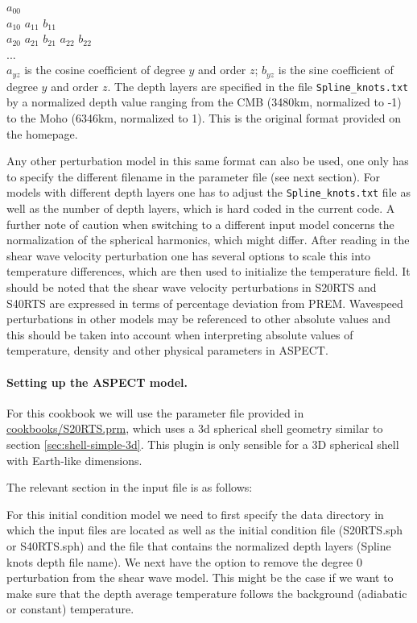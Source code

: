 \documentclass{article}
\newcommand{\aspect}{\textsc{ASPECT}}
\begin{document}
\noindent $a_{00}$ \\
$a_{10}$ $a_{11}$ $b_{11}$ \\
$a_{20}$ $a_{21}$ $b_{21}$ $a_{22}$ $b_{22}$ \\
... \\

$a_{yz}$ is the cosine coefficient of degree $y$ and order $z$; $b_{yz}$ is
the sine coefficient of degree $y$ and order $z$. The depth layers are specified
in the file \texttt{Spline\_knots.txt} by a normalized depth value ranging from the CMB (3480km,
normalized to -1) to the Moho (6346km, normalized to 1). This is the original
format provided on the homepage.

Any other perturbation model in this same format can also be used, one only
has to specify the different filename in the parameter file (see next section).
For models with different depth layers one has to adjust the \texttt{Spline\_knots.txt}
file as well as the number of depth layers, which is hard coded in the current
code. A further note of caution when switching to a different input model
concerns the normalization of the spherical harmonics, which might differ.
After reading in the shear wave velocity perturbation one has several options
to scale this into temperature differences, which are then used to initialize
the temperature field. It should be noted that the shear wave velocity perturbations in
S20RTS and S40RTS are expressed in terms of percentage deviation from PREM. Wavespeed perturbations
in other models may be referenced to other absolute values and this should be taken into account
when interpreting absolute values of temperature, density and other physical parameters in ASPECT.

\paragraph{Setting up the \aspect{} model.}

For this cookbook we will use the parameter file provided in
\url{cookbooks/S20RTS.prm}, which uses a 3d spherical shell
geometry similar to section \ref{sec:shell-simple-3d}. This plugin is only sensible
for a 3D spherical shell with Earth-like dimensions.

The relevant section in the input file is as follows:



For this initial condition model we need to first specify the data directory in which
the input files are located as well as the initial condition file (S20RTS.sph or
S40RTS.sph) and the file that contains the normalized depth layers (Spline knots depth file name).
We next have the option to remove the degree 0 perturbation from the shear
wave model. This might be the case if we want to make sure that the depth
average temperature follows the background (adiabatic or constant) temperature.
\end{document}
